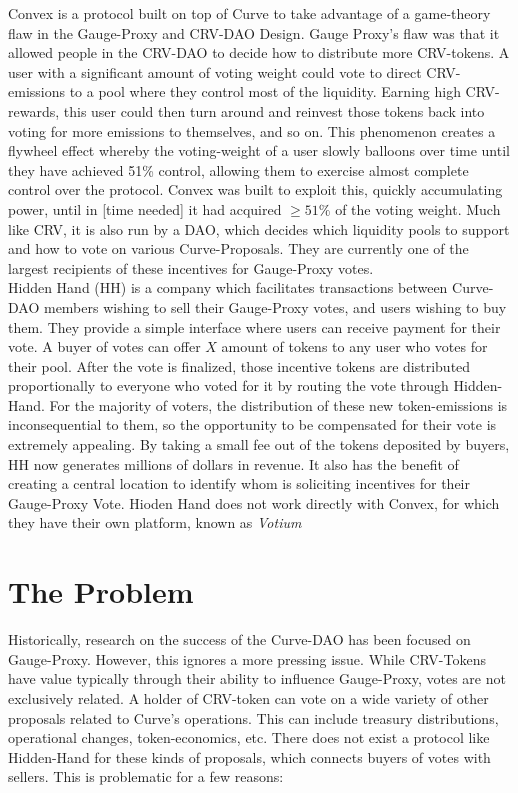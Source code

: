 \documentclass{article}
\begin{document}
Convex is a protocol built on top of Curve to take advantage of a game-theory flaw in the Gauge-Proxy and CRV-DAO Design. Gauge Proxy's flaw was that it allowed people in the CRV-DAO to decide how to distribute more CRV-tokens. A user with a significant amount of voting weight could vote to direct CRV-emissions to a pool where they control most of the liquidity. Earning high CRV-rewards, this user could then turn around and reinvest those tokens back into voting for more emissions to themselves, and so on. This phenomenon creates a flywheel effect whereby the voting-weight of a user slowly balloons over time until they have achieved 51\% control, allowing them to exercise almost complete control over the protocol. Convex was built to exploit this, quickly accumulating power, until in [time needed] it had acquired $\ge51\%$ of the voting weight. Much like CRV, it is also run by a DAO, which decides which liquidity pools to support and how to vote on various Curve-Proposals. They are currently one of the largest recipients of these incentives for Gauge-Proxy votes.\\

Hidden Hand (HH) is a company which facilitates transactions between Curve-DAO members wishing to sell their Gauge-Proxy votes, and users wishing to buy them. They provide a simple interface where users can receive payment for their vote. A buyer of votes can offer $X$ amount of tokens to any user who votes for their pool. After the vote is finalized, those incentive tokens are distributed proportionally to everyone who voted for it by routing the vote through Hidden-Hand. For the majority of voters, the distribution of these new token-emissions is inconsequential to them, so the opportunity to be compensated for their vote is extremely appealing. By taking a small fee out of the tokens deposited by buyers, HH now generates millions of dollars in revenue. It also has the benefit of creating a central location to identify whom is soliciting incentives for their Gauge-Proxy Vote. Hioden Hand does not work directly with Convex, for which they have their own platform, known as \emph{Votium}

\section{The Problem}

Historically, research on the success of the Curve-DAO has been focused on Gauge-Proxy. However, this ignores a more pressing issue. While CRV-Tokens have value typically through their ability to influence Gauge-Proxy, votes are not exclusively related. A holder of CRV-token can vote on a wide variety of other proposals related to Curve's operations. This can include treasury distributions, operational changes, token-economics, etc. There does not exist a protocol like Hidden-Hand for these kinds of proposals, which connects buyers of votes with sellers. This is problematic for a few reasons:
\end{document}
